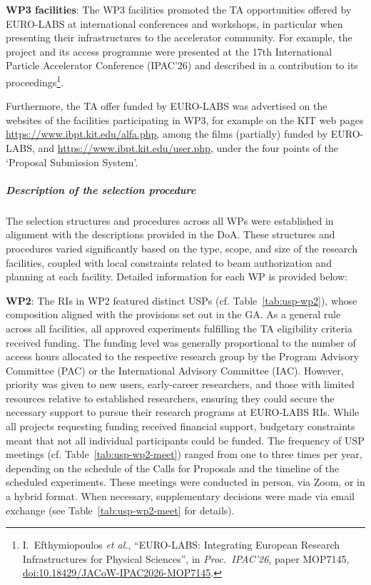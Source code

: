 \textbf{WP3 facilities}: The WP3 facilities promoted the TA opportunities offered by EURO-LABS at international conferences and workshops, in particular when presenting their infrastructures to the accelerator community. For example, the project and its access programme were presented at the 17th International Particle Accelerator Conference (IPAC'26) and described in a contribution to its proceedings\footnote{I.~Efthymiopoulos \textit{et al.}, ``EURO-LABS: Integrating European Research Infrastructures for Physical Sciences'', in \textit{Proc.\ IPAC'26}, paper MOP7145, \href{https://doi.org/10.18429/JACoW-IPAC2026-MOP7145}{doi:10.18429/JACoW-IPAC2026-MOP7145}.}.

Furthermore, the TA offer funded by EURO-LABS was advertised on the websites of the facilities participating in WP3, for example on the KIT web pages \url{https://www.ibpt.kit.edu/alfa.php}, among the films (partially) funded by EURO-LABS, and \url{https://www.ibpt.kit.edu/user.php}, under the four points of the `Proposal Submission System'.


\subparagraph{Description of the selection procedure}\mbox{}


The selection structures and procedures across all WPs were established in alignment with the descriptions provided in the DoA. These structures and procedures varied significantly based on the type, scope, and size of the research facilities, coupled with local constraints related to beam authorization and planning at each facility. Detailed information for each WP is provided below:



\textbf{WP2}: The RIs in WP2 featured distinct USPs (cf. Table~\ref{tab:usp-wp2}), whose composition aligned with the provisions set out in the GA. As a general rule across all facilities, all approved experiments fulfilling the TA eligibility criteria received funding. The funding level was generally proportional to the number of access hours allocated to the respective research group by the Program Advisory Committee (PAC) or the International Advisory Committee (IAC). However, priority was given to new users, early-career researchers, and those with limited resources relative to established researchers, ensuring they could secure the necessary support to pursue their research programs at EURO-LABS RIs. While all projects requesting funding received financial support, budgetary constraints meant that not all individual participants could be funded. The frequency of USP meetings (cf. Table~\ref{tab:usp-wp2-meet}) ranged from one to three times per year, depending on the schedule of the Calls for Proposals and the timeline of the scheduled experiments. These meetings were conducted in person, via Zoom, or in a hybrid format. When necessary, supplementary decisions were made via email exchange (see Table~\ref{tab:usp-wp2-meet} for details).


